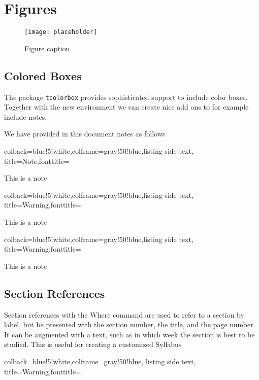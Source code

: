 
\section{Figures}

\begin{figure}[h]
\centering\texttt{[image: placeholder]}
\caption{Figure caption}
\end{figure}

\subsection{Colored Boxes}

The package \verb|tcolorbox| provides sophisticated support to include
color boxes. Together with the new environment we can create nice add
ons to for example include notes.


We have provided in this document notes as follows


\begin{tcblisting}{colback=blue!5!white,colframe=gray!50!blue,listing side text,  title=Note,fonttitle=\bfseries}
\begin{NOTE}
This is a note
\end{NOTE}
\end{tcblisting}

\begin{tcblisting}{colback=blue!5!white,colframe=gray!50!blue,listing side text,  title=Warning,fonttitle=\bfseries}
\begin{WARNING}
This is a note
\end{WARNING}
\end{tcblisting}

\begin{tcblisting}{colback=blue!5!white,colframe=gray!50!blue,listing side text,  title=Warning,fonttitle=\bfseries}
\begin{IU}
This is a note
\end{IU}
\end{tcblisting}

\subsection{Section References}

Section references with the Where command are used to refer to a
section by label, but be presented with the section number, the title,
and the page number. It can be augmented with a text, such as in which
week the section is best to be studied. This is useful for creating a
customized Syllabus

\begin{tcblisting}{colback=blue!5!white,colframe=gray!50!blue,
    listing side text, title=Warning,fonttitle=\bfseries}
\end{tcblisting}

